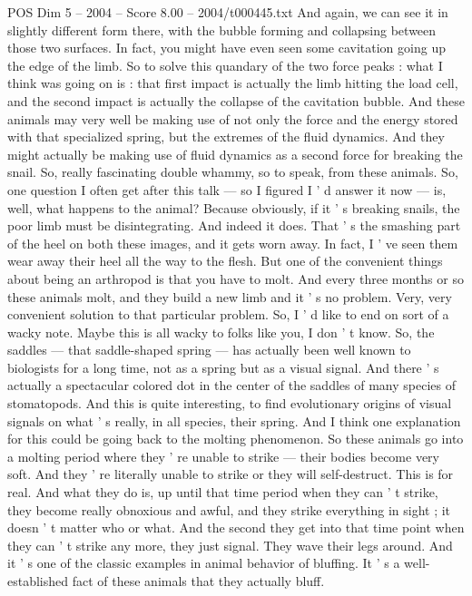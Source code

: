 \begin{textsample}{POS Dim 5 – 2004 – Score 8.00 – 2004/t000445.txt}
And again, we can see it in slightly different form there, with the bubble forming and collapsing between those two surfaces.
In fact, you might have even seen some cavitation going up the edge of the limb.
So to solve this quandary of the two force peaks : what I think was going on is : that first impact is actually the limb hitting the load cell, and the second impact is actually the collapse of the cavitation bubble.
And these animals may very well be making use of not only the force and the energy stored with that specialized spring, but the extremes of the fluid dynamics.
And they might actually be making use of fluid dynamics as a second force for breaking the snail.
So, really fascinating double whammy, so to speak, from these animals.
So, one question I often get after this talk — so I figured I ' d answer it now — is, well, what happens to the animal?
Because obviously, if it ' s breaking snails, the poor limb must be disintegrating.
And indeed it does.
That ' s the smashing part of the heel on both these images, and it gets worn away.
In fact, I ' ve seen them wear away their heel all the way to the flesh.
But one of the convenient things about being an arthropod is that you have to molt.
And every three months or so these animals molt, and they build a new limb and it ' s no problem.
Very, very convenient solution to that particular problem.
So, I ' d like to end on sort of a wacky note.
Maybe this is all wacky to folks like you, I don ' t know.
So, the saddles — that saddle-shaped spring — has actually been well known to biologists for a long time, not as a spring but as a visual signal.
And there ' s actually a spectacular colored dot in the center of the saddles of many species of stomatopods.
And this is quite interesting, to find evolutionary origins of visual signals on what ' s really, in all species, their spring.
And I think one explanation for this could be going back to the molting phenomenon.
So these animals go into a molting period where they ' re unable to strike — their bodies become very soft.
And they ' re literally unable to strike or they will self-destruct.
This is for real.
And what they do is, up until that time period when they can ' t strike, they become really obnoxious and awful, and they strike everything in sight ; it doesn ' t matter who or what.
And the second they get into that time point when they can ' t strike any more, they just signal.
They wave their legs around.
And it ' s one of the classic examples in animal behavior of bluffing.
It ' s a well-established fact of these animals that they actually bluff.

\end{textsample}
